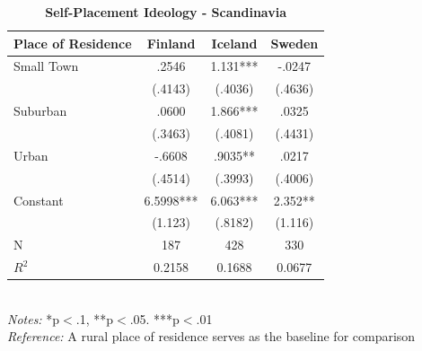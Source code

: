 \documentclass[12pt, titlepage]{article}
\newcommand\e{\emph}
\newcommand\tb{\textbf}
\begin{document}
\begin{singlespace}
	\begin{table}[H]
		\centering
		\caption{\tb{Self-Placement Ideology - Scandinavia}}
		\begin{tabulary}{\linewidth}{l c c c}
			\\
			\hline
			\tb{Place of Residence}&\tb{Finland}&\tb{Iceland}&\tb{Sweden} \\
			\hline
			Small Town&.2546&1.131***&-.0247 \\
			&(.4143)&(.4036)&(.4636) \\
			Suburban&.0600&1.866***&.0325 \\
			&(.3463)&(.4081)&(.4431) \\
			Urban&-.6608&.9035**& .0217\\
			&(.4514)&(.3993)&(.4006) \\
			Constant&6.5998***&6.063***&2.352** \\
			&(1.123)&(.8182)&(1.116) \\
			N&187&428&330\\
			$R^2$&0.2158&0.1688&0.0677 \\
			\hline
		\end{tabulary}
		\\
		\e{Notes:} *p$<$.1, **p$<$.05. ***p$<$.01 \\
		\e{Reference:} A rural place of residence serves as the baseline for comparison
		\label{table7}
	\end{table}
\end{singlespace}
\end{document}

